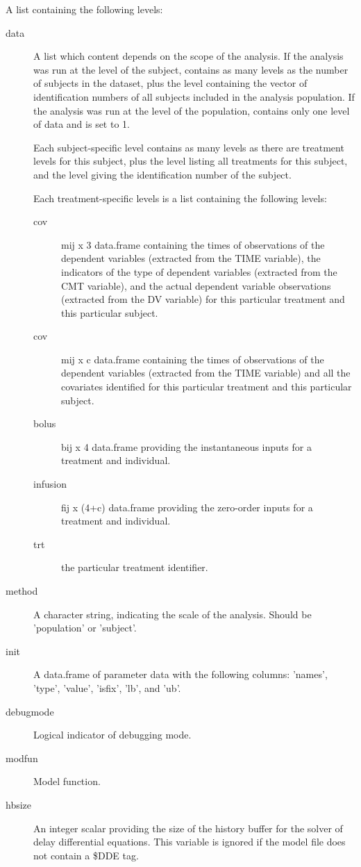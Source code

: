 \begin{Arguments}
\begin{ldescription}
\item[\code{problem}] A list containing the following levels:\begin{description}

\item[data] A list which content depends on the scope of the analysis. If 
the analysis was run at the level of the subject,  contains as 
many levels as the number of subjects in the dataset, plus the 
level containing the vector of identification numbers of all subjects 
included in the analysis population. If the analysis was run at the level 
of the population,  contains only one level of data and 
 is set to 1.

Each subject-specific level contains as many levels as there are treatment
levels for this subject, plus the  level listing all treatments
for this subject, and the  level giving the identification number
of the subject. 

Each treatment-specific levels is a list containing the following levels: 
\begin{description}

\item[cov] mij x 3 data.frame containing the times of observations of the
dependent variables (extracted from the TIME variable), the indicators
of the type of dependent variables (extracted from the CMT variable),
and the actual dependent variable observations (extracted from the 
DV variable) for this particular treatment and this particular 
subject.
\item[cov] mij x c data.frame containing the times of observations of 
the dependent variables (extracted from the TIME variable) and all the
covariates identified for this particular treatment and this 
particular subject.
\item[bolus] bij x 4 data.frame providing the instantaneous inputs for
a treatment and individual.
\item[infusion] fij x (4+c) data.frame providing the zero-order inputs for
a treatment and individual.
\item[trt] the particular treatment identifier.
\end{description}


\item[method] A character string, indicating the scale of the analysis. Should
be 'population' or 'subject'.
\item[init] A data.frame of parameter data with the following columns:
'names', 'type', 'value', 'isfix', 'lb', and 'ub'.
\item[debugmode] Logical indicator of debugging mode.
\item[modfun] Model function.
\item[hbsize] An integer scalar providing the size of the history buffer for
the solver of delay differential equations. This variable is ignored if
the model file does not contain a \$DDE tag.


\end{description}
\end{ldescription}
\end{Arguments}
